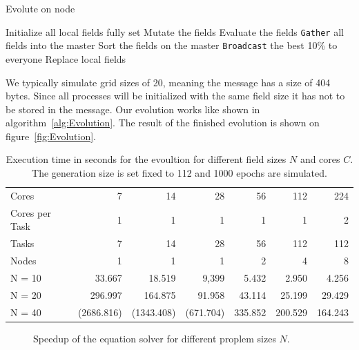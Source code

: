 \documentclass[12pt]{article}
\begin{document}
\begin{algorithm}[p]
    \caption{Evolute on node}
    \begin{algorithmic}
        \STATE Initialize all local fields fully set
            \STATE Mutate the fields
            \STATE Evaluate the fields
            \STATE \texttt{Gather} all fields into the master
            \STATE Sort the fields on the master
            \STATE \texttt{Broadcast} the best 10\% to everyone
            \STATE Replace local fields
        \ENDFOR
    \end{algorithmic}
    \label{alg:Evolution}
\end{algorithm}

We typically simulate grid sizes of 20, meaning the message has a size of 404 bytes. Since all processes will be initialized with the same field size it has not to be stored in the message. Our evolution works like shown in algorithm~\ref{alg:Evolution}. The result of the finished evolution is shown on figure~\ref{fig:Evolution}.


\begin{table}[p]
    \centering
    \begin{tabular}{lrrrrrr}
        \toprule
        Cores & 7 & 14 & 28 & 56 & 112 & 224 \\
        Cores per Task & 1 & 1 & 1 & 1 & 1 & 2 \\
        Tasks & 7 & 14 & 28 & 56 & 112 & 112 \\
        Nodes & 1 & 1 & 1 & 2 & 4 & 8 \\
        \midrule
        N = 10 & 33.667     & 18.519 & 9,399 & 5.432 & 2.950 & 4.256 \\
        N = 20 & 296.997    & 164.875 & 91.958 & 43.114 & 25.199 & 29.429 \\
        N = 40 & (2686.816)          & (1343.408) & (671.704) & 335.852 & 200.529 & 164.243 \\
        \bottomrule
    \end{tabular}
    \caption{Execution time in seconds for the evoultion for different field sizes $N$ and cores $C$. The generation size is set fixed to 112 and 1000 epochs are simulated.}
    \label{tab:Speedup}
\end{table}

\begin{figure}[p]
    \centering
    
    \caption{Speedup of the equation solver for different proplem sizes $N$.}
    \label{fig:Speedup}
\end{figure}
\end{document}
